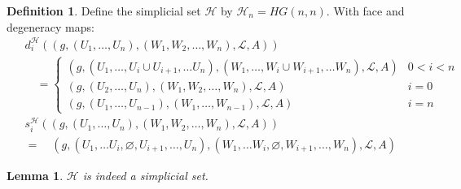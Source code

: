 \documentclass[12pt]{article}
\newtheorem{lemma}[theorem]{Lemma}
\theoremstyle{definition}
\newtheorem{definition}[theorem]{Definition}
\newcommand{\1}{\mathbbm{1}}
\renewcommand{\L}{\mathcal{L}}
\renewcommand{\H}{\mathcal{H}}
\begin{document}
\begin{definition}
Define the simplicial set $\H$ by $\H_n = HG(n,n)$. With face and degeneracy maps:
\begin{align*}
    &d_i^{\H} ((g, (U_1, \dots, U_n), (W_1, W_2, \dots, W_n), \L, A))\\
    &\quad=\begin{cases}
        (g, (U_1, \dots, U_i\cup U_{i+1}, \dots U_n), (W_1, \dots, W_i\cup W_{i+1}, \dots W_n), \L, A) & 0 < i < n\\
        (g, (U_2, \dots, U_n), (W_1, W_2, \dots, W_n), \L, A) & i = 0\\
        (g, (U_1, \dots, U_{n-1}), (W_1, \dots, W_{n-1}), \L, A) & i = n
    \end{cases}\\
    \hspace{5pt}
    &s_i^{\H}((g, (U_1, \dots, U_n), (W_1, W_2, \dots, W_n), \L, A))\\
    &=\quad (g, (U_1, \dots U_i, \varnothing, U_{i+1}, \dots, U_n), (W_1, \dots W_i, \varnothing, W_{i+1}, \dots, W_n), \L, A)
\end{align*}
\end{definition}

\begin{lemma}
    $\H$ is indeed a simplicial set.
\end{lemma}
\end{document}
